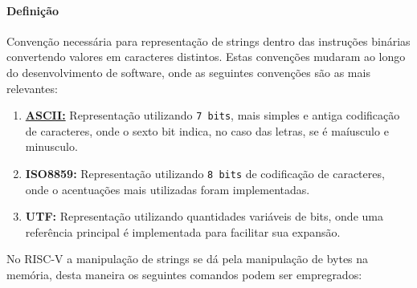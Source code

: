 \documentclass{article}
\begin{document}
            \paragraph{Definição}Convenção necessária para representação de strings dentro das instruções binárias convertendo valores em caracteres distintos. Estas convenções mudaram ao longo do desenvolvimento de software, onde as seguintes convenções são as mais relevantes:
                \begin{enumerate}[rightmargin = \leftmargin]
                    \item \href{https://pt.wikipedia.org/wiki/ASCII}{\textbf{ASCII:}} Representação utilizando \texttt{7 bits}, mais simples e antiga codificação de caracteres, onde o sexto bit indica, no caso das letras, se é maíusculo e minusculo.
                    \item \textbf{ISO8859:} Representação utilizando \texttt{8 bits} de codificação de caracteres, onde o acentuações mais utilizadas foram implementadas.
                    \item \textbf{UTF:} Representação utilizando quantidades variáveis de bits, onde uma referência principal é implementada para facilitar sua expansão.
                \end{enumerate}
            No RISC-V a manipulação de strings se dá pela manipulação de bytes na memória, desta maneira os seguintes comandos podem ser empregrados:
\end{document}
